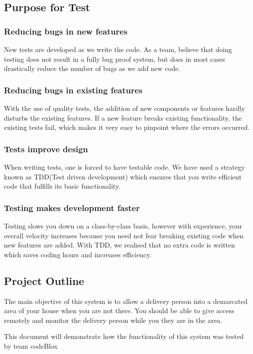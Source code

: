 \documentclass[11pt]{article}
\begin{document}
\subsection{Purpose for Test}
\subsubsection{Reducing bugs in new features}
New tests are developed as we write the code. As a team, believe that doing testing does not result in a fully bug proof system, but does in most cases drastically reduce the number of bugs as we add new code.

\subsubsection{Reducing bugs in existing features}
With the use of quality tests, the addition of new components or features hardly disturbs the existing features. If a new feature breaks existing functionality, the existing tests fail, which makes it very easy to pinpoint where the errors occurred.

\subsubsection{Tests improve design}
When writing tests, one is forced to have testable code. We have used a strategy known as TDD(Test driven development) which ensures that you write efficient code that fulfills its basic functionality.

\subsubsection{Testing makes development faster}
Testing slows you down on a class-by-class basis, however with experience, your overall velocity increases because you need not fear breaking existing code when new features are added. With TDD, we realised that no extra code is written which saves coding hours and increases efficiency.  

\subsection{Project Outline}
The main objective of this system is to allow a delivery person into a demarcated area of your house when you are not there. You should be able to give access remotely and monitor the delivery person while you they are in the area.

This document will demonstrate how the functionality of this system was tested by team codeBlox
\end{document}
